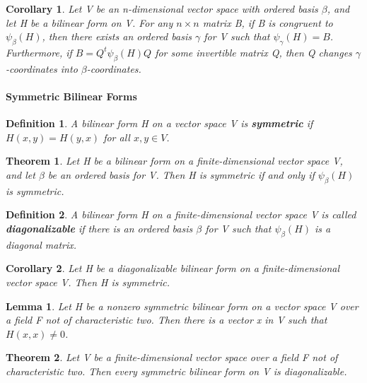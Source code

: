 \documentclass{article}
\newcommand{\bd}[1]{\textbf{#1}}
\theoremstyle{plain}
\newtheorem{theorem}{Theorem}[section]
\newtheorem*{lemma}{Lemma}
\newtheorem*{corollary}{Corollary}
\newtheorem*{definition1}{Definition}
\theoremstyle{plain} %
\begin{document}
\begin{corollary}
  Let V be an n-dimensional vector space with ordered basis $\beta$, and let H be a bilinear form on V. For any $n \times n$ matrix B, if B is congruent to $\psi_\beta(H)$, then there exists an ordered basis $\gamma$ for V such that $\psi_\gamma(H) = B$. Furthermore, if $B = Q^t\psi_\beta(H)Q$ for some invertible matrix Q, then Q changes $\gamma$-coordinates into $\beta$-coordinates.
\end{corollary}

\paragraph{Symmetric Bilinear Forms}

\begin{definition1}
  A bilinear form H on a vector space V is \bd{symmetric} if $H(x, y) = H(y, x)$ for all $x, y \in V$.
\end{definition1}

\begin{theorem}
  Let H be a bilinear form on a finite-dimensional vector space V, and let $\beta$ be an ordered basis for V. Then H is symmetric if and only if $\psi_\beta(H)$ is symmetric.
\end{theorem}

\begin{definition1}
  A bilinear form H on a finite-dimensional vector space V is called \bd{diagonalizable} if there is an ordered basis $\beta$ for V such that $\psi_\beta(H)$ is a diagonal matrix.
\end{definition1}

\begin{corollary}
  Let H be a diagonalizable bilinear form on a  finite-dimensional vector space V. Then H is symmetric.
\end{corollary}

\begin{lemma}
  Let H be a nonzero symmetric bilinear form on a vector space
V over a field F not of characteristic two. Then there is a vector x in V such that $H(x, x) \neq 0$.
\end{lemma}

\begin{theorem}
  Let V be a finite-dimensional vector space over a field F not of characteristic two. Then every symmetric bilinear form on V is diagonalizable.
\end{theorem}

\end{document}
